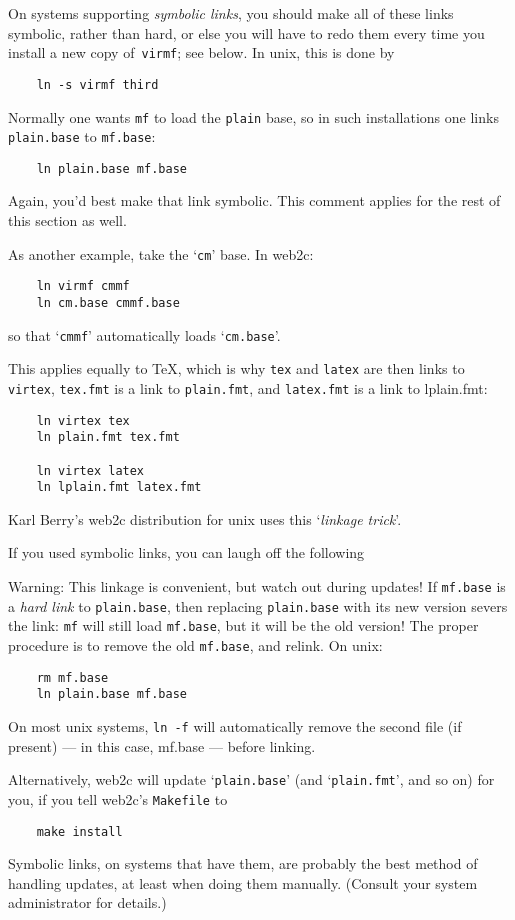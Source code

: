 On systems supporting {\em symbolic links\/}, you should make all of
these links symbolic, rather than hard, or else you will have to redo
them every time you install a new copy of~{\tt virmf}; see below.
In {\sc unix}, this is done by
\begin{verbatim}
    ln -s virmf third
\end{verbatim}

Normally one wants {\tt mf} to load the {\tt plain} base,
so in such installations one links {\tt plain.base} to {\tt mf.base}:
\begin{verbatim}
    ln plain.base mf.base
\end{verbatim}
Again, you'd best make that link symbolic.  This comment applies for
the rest of this section as well.

As another example, take the `{\tt cm}' base.  In {\sf web2c}:
\begin{verbatim}
    ln virmf cmmf
    ln cm.base cmmf.base
\end{verbatim}
so that `{\tt cmmf}' automatically loads `{\tt cm.base}'.

This applies equally to \TeX{}, which is why {\tt tex} and {\tt latex}
are then links to {\tt virtex}, {\tt tex.fmt} is a link to
{\tt plain.fmt}, and {\tt latex.fmt} is a link to {lplain.fmt}:
\begin{verbatim}
    ln virtex tex
    ln plain.fmt tex.fmt

    ln virtex latex
    ln lplain.fmt latex.fmt
\end{verbatim}

Karl {\sc Berry\/}'s {\sf web2c} distribution for {\sc unix} uses
this `{\em linkage trick\/}'.

If you used symbolic links, you can laugh off the following

{\sc Warning:}
This linkage is convenient, but watch out during updates!
If {\tt mf.base} is a {\em hard link\/}
to {\tt plain.base}, then replacing {\tt plain.base} with its
new version severs the link:  {\tt mf} will still load {\tt mf.base},
but it will be the old version!  The proper procedure is to remove
the old {\tt mf.base}, and relink.  On {\sc unix}:
\begin{verbatim}
    rm mf.base
    ln plain.base mf.base
\end{verbatim}
On most {\sc unix\/} systems, {\tt ln -f} will automatically remove
the second file (if present) --- in this case, mf.base --- before linking.

Alternatively, {\sf web2c} will update `{\tt plain.base}'
(and `{\tt plain.fmt}', and so on) for you,
if you tell {\sf web2c\/}'s {\tt Makefile}  to
\begin{verbatim}
    make install
\end{verbatim}
Symbolic links, on systems that have them, are probably the best
method of handling updates, at least when doing them manually.
(Consult your system administrator for details.)


